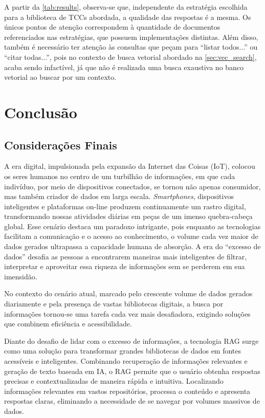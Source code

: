\documentclass[a4paper, 12pt]{article}
\begin{document}
    A partir da \autoref{tab:results}, observa-se que, independente da estratégia escolhida para a biblioteca de TCCs abordada, a qualidade das respostas é a mesma. Os únicos pontos de atenção correspondem à quantidade de documentos referenciados nas estratégias, que possuem implementações distintas. Além disso, também é necessário ter atenção às consultas que peçam para ``listar todos...'' ou ``citar todas...'', pois no contexto de busca vetorial abordado na \autoref{sec:vec_search}, acaba sendo infactível, já que não é realizada uma busca exaustiva no banco vetorial ao buscar por um contexto.

    \clearpage
    
    \section{Conclusão}
    
    \subsection{Considerações Finais}

    A era digital, impulsionada pela expansão da Internet das Coisas (IoT), colocou os seres humanos no centro de um turbilhão de informações, em que cada indivíduo, por meio de dispositivos conectados, se tornou não apenas consumidor, mas também criador de dados em larga escala. \textit{Smartphones}, dispositivos inteligentes e plataformas on-line produzem continuamente um rastro digital, transformando nossas atividades diárias em peças de um imenso quebra-cabeça global. Esse cenário destaca um paradoxo intrigante, pois enquanto as tecnologias facilitam a comunicação e o acesso ao conhecimento, o volume cada vez maior de dados gerados ultrapassa a capacidade humana de absorção. A era do ``excesso de dados'' desafia as pessoas a encontrarem maneiras mais inteligentes de filtrar, interpretar e aproveitar essa riqueza de informações sem se perderem em sua imensidão.

    No contexto do cenário atual, marcado pelo crescente volume de dados gerados diariamente e pela presença de vastas bibliotecas digitais, a busca por informações tornou-se uma tarefa cada vez mais desafiadora, exigindo soluções que combinem eficiência e acessibilidade.

    Diante do desafio de lidar com o excesso de informações, a tecnologia RAG surge como uma solução para transformar grandes bibliotecas de dados em fontes acessíveis e inteligentes. Combinando recuperação de informações relevantes e geração de texto baseada em IA, o RAG permite que o usuário obtenha respostas precisas e contextualizadas de maneira rápida e intuitiva. Localizando informações relevantes em vastos repositórios, processa o conteúdo e apresenta respostas claras, eliminando a necessidade de se navegar por volumes massivos de dados.
    
\end{document}
